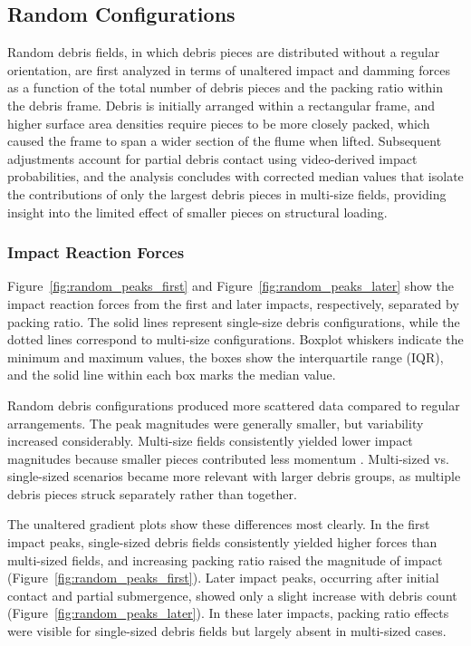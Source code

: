 \documentclass{article}
\begin{document}
{\subsection{Random Configurations}
Random debris fields, in which debris pieces are distributed without a regular orientation, are first analyzed in terms of unaltered impact and damming forces as a function of the total number of debris pieces and the packing ratio within the debris frame. Debris is initially arranged within a rectangular frame, and higher surface area densities require pieces to be more closely packed, which caused the frame to span a wider section of the flume when lifted. Subsequent adjustments account for partial debris contact using video-derived impact probabilities, and the analysis concludes with corrected median values that isolate the contributions of only the largest debris pieces in multi-size fields, providing insight into the limited effect of smaller pieces on structural loading.

\subsubsection{Impact Reaction Forces} 
Figure~\ref{fig:random_peaks_first} and Figure~\ref{fig:random_peaks_later} show the impact reaction forces from the first and later impacts, respectively, separated by packing ratio. The solid lines represent single-size debris configurations, while the dotted lines correspond to multi-size configurations. Boxplot whiskers indicate the minimum and maximum values, the boxes show the interquartile range (IQR), and the solid line within each box marks the median value.

Random debris configurations produced more scattered data compared to regular arrangements. The peak magnitudes were generally smaller, but variability increased considerably. Multi-size fields consistently yielded lower impact magnitudes because smaller pieces contributed less momentum . Multi-sized vs. single-sized scenarios became more relevant with larger debris groups, as multiple debris pieces struck separately rather than together.

The unaltered gradient plots show these differences most clearly. In the first impact peaks, single-sized debris fields consistently yielded higher forces than multi-sized fields, and increasing packing ratio raised the magnitude of impact (Figure~\ref{fig:random_peaks_first}). Later impact peaks, occurring after initial contact and partial submergence, showed only a slight increase with debris count (Figure~\ref{fig:random_peaks_later}). In these later impacts, packing ratio effects were visible for single-sized debris fields but largely absent in multi-sized cases.

}
\end{document}
